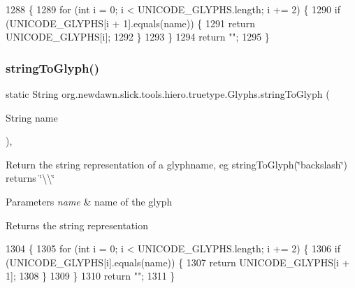 \begin{DoxyCode}
1288                                                           \{
1289         \textcolor{keywordflow}{for} (\textcolor{keywordtype}{int} i = 0; i < UNICODE\_GLYPHS.length; i += 2) \{
1290             \textcolor{keywordflow}{if} (UNICODE\_GLYPHS[i + 1].equals(name)) \{
1291                 \textcolor{keywordflow}{return} UNICODE\_GLYPHS[i];
1292             \}
1293         \}
1294         \textcolor{keywordflow}{return} \textcolor{stringliteral}{""};
1295     \}
\end{DoxyCode}
\mbox{\label{classorg_1_1newdawn_1_1slick_1_1tools_1_1hiero_1_1truetype_1_1_glyphs_a50508eacea49c4be9778f84d28b186d4}} 
\subsubsection{\texorpdfstring{string\+To\+Glyph()}{stringToGlyph()}}
{\footnotesize\ttfamily static String org.\+newdawn.\+slick.\+tools.\+hiero.\+truetype.\+Glyphs.\+string\+To\+Glyph (\begin{DoxyParamCaption}\item[{String}]{name }\end{DoxyParamCaption})\hspace{0.3cm}{\ttfamily [inline]}, {\ttfamily [static]}}

Return the string representation of a glyphname, eg string\+To\+Glyph(\char`\"{}backslash\char`\"{}) returns \char`\"{}\textbackslash{}\textbackslash{}\char`\"{}


\begin{DoxyParams}{Parameters}
{\em name} & name of the glyph \\
\hline
\end{DoxyParams}
\begin{DoxyReturn}{Returns}
the string representation 
\end{DoxyReturn}

\begin{DoxyCode}
1304                                                     \{
1305         \textcolor{keywordflow}{for} (\textcolor{keywordtype}{int} i = 0; i < UNICODE\_GLYPHS.length; i += 2) \{
1306             \textcolor{keywordflow}{if} (UNICODE\_GLYPHS[i].equals(name)) \{
1307                 \textcolor{keywordflow}{return} UNICODE\_GLYPHS[i + 1];
1308             \}
1309         \}
1310         \textcolor{keywordflow}{return} \textcolor{stringliteral}{""};
1311     \}
\end{DoxyCode}


